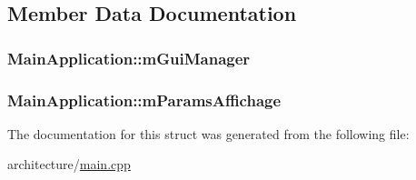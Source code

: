 \subsection{Member Data Documentation}
\subsubsection[{\texorpdfstring{m\+Gui\+Manager}{mGuiManager}}]{ Main\+Application\+::m\+Gui\+Manager}\hypertarget{struct_main_application_a02a37af569312e07b3bd8f8995ef50ec}{}\label{struct_main_application_a02a37af569312e07b3bd8f8995ef50ec}
\subsubsection[{\texorpdfstring{m\+Params\+Affichage}{mParamsAffichage}}]{ Main\+Application\+::m\+Params\+Affichage}\hypertarget{struct_main_application_a6d4bd1a7fbe48146153e7cb5082d6c15}{}\label{struct_main_application_a6d4bd1a7fbe48146153e7cb5082d6c15}


The documentation for this struct was generated from the following file\+:\begin{DoxyCompactItemize}
\item 
architecture/\hyperlink{main_8cpp}{main.\+cpp}\end{DoxyCompactItemize}
